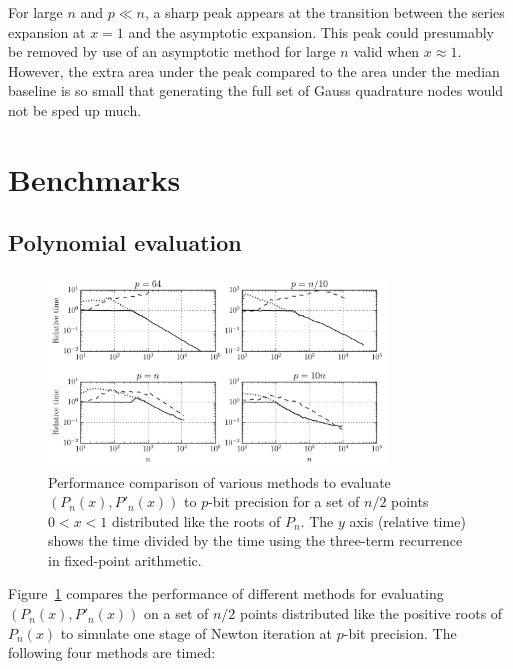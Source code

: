 \documentclass[11pt,a4paper]{article}
\begin{document}
For large $n$ and $p \ll n$, a sharp peak appears at the transition between the series expansion at $x = 1$ and the asymptotic expansion. This peak could presumably be removed by use of an asymptotic method for large $n$ valid when $x \approx 1$. However, the extra area under the peak compared to the area under the median baseline is so small that generating the full set of Gauss quadrature nodes would not be sped up much.

\section{Benchmarks}

\label{sec:bench}

\subsection{Polynomial evaluation}

\begin{figure}[h!]
\begin{centering}
\includegraphics[width=0.8\textwidth]{benchplot}
\caption{Performance comparison of various methods to evaluate $(P_n(x), P'_n(x))$ to $p$-bit precision for a
set of $n / 2$ points $0 < x < 1$ distributed like the roots of $P_n$.
The $y$ axis (relative time) shows the time divided by the time
using the three-term recurrence in fixed-point arithmetic.}
\label{fig:benchplot}
\end{centering}
\end{figure}

Figure~\ref{fig:benchplot} compares the performance of different methods
for evaluating $(P_n(x), P'_n(x))$ on a set of $n/2$ points
distributed like the positive roots of $P_n(x)$
to simulate one stage of Newton iteration at $p$-bit precision.
The following four methods are timed:
\end{document}
